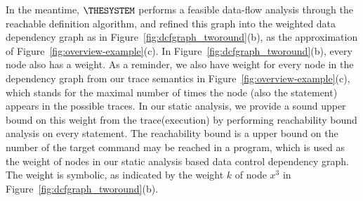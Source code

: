 In the meantime, $\THESYSTEM$ performs a feasible data-flow analysis through the reachable definition algorithm, and refined this graph
into the weighted data dependency graph as in Figure~\ref{fig:dcfgraph_tworound}(b), as the approximation of Figure~\ref{fig:overview-example}(c).
 In Figure~\ref{fig:dcfgraph_tworound}(b), every node also has a weight. As a reminder, we also have weight for every node in the dependency graph from our trace semantics in Figure~\ref{fig:overview-example}(c), which stands for the maximal number of times the node (also the statement) appears in the possible traces. In our static analysis, we provide a sound upper bound on this weight from the trace(execution) by performing reachability bound analysis on every statement. The reachability bound is a upper bound on the number of the target command may be reached in a program, which is used as the weight of nodes in our static analysis based data control dependency graph. The weight is symbolic, as indicated by the weight $k$ of node $x^{3}$ in Figure~\ref{fig:dcfgraph_tworound}(b).
 
 
